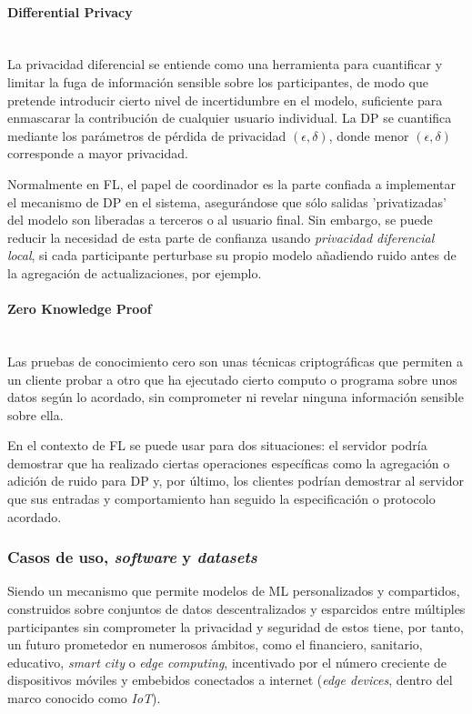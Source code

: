 \documentclass[00-Trabajo_Final.tex]{subfiles}
\begin{document}
\paragraph*{Differential Privacy}\mbox{}\\
La privacidad diferencial se entiende como una herramienta para cuantificar y limitar la fuga de información sensible sobre los participantes, de modo que pretende introducir cierto nivel de incertidumbre en el modelo, suficiente para enmascarar la contribución de cualquier usuario individual. La DP se cuantifica mediante los parámetros de pérdida de privacidad $(\epsilon, \delta)$, donde menor $(\epsilon, \delta)$ corresponde a mayor privacidad.

Normalmente en FL, el papel de coordinador es la parte confiada a implementar el mecanismo de DP en el sistema, asegurándose que sólo salidas 'privatizadas' del modelo son liberadas a terceros o al usuario final. Sin embargo, se puede reducir la necesidad de esta parte de confianza usando \textit{privacidad diferencial local}, si cada participante perturbase su propio modelo añadiendo ruido antes de la agregación de actualizaciones, por ejemplo.

\paragraph*{Zero Knowledge Proof}\mbox{}\\
Las pruebas de conocimiento cero son  unas técnicas criptográficas que permiten a un cliente probar a otro que ha ejecutado cierto computo o programa sobre unos datos según lo acordado, sin comprometer ni revelar ninguna información sensible sobre ella.

En el contexto de FL se puede usar para dos situaciones: el servidor podría demostrar que ha realizado ciertas operaciones específicas como la agregación o adición de ruido para DP y, por último, los clientes podrían demostrar al servidor que sus entradas y comportamiento han seguido la especificación o protocolo acordado.

\subsubsection{Casos de uso, \textit{software} y \textit{datasets}}
Siendo un mecanismo que permite modelos de ML personalizados y compartidos, construidos sobre conjuntos de datos descentralizados y esparcidos entre múltiples participantes sin comprometer la privacidad y seguridad de estos tiene, por tanto, un futuro prometedor en numerosos ámbitos, como el financiero, sanitario, educativo, \textit{smart city} o \textit{edge computing}, incentivado por el número creciente de dispositivos móviles y embebidos conectados a internet (\textit{edge devices}, dentro del marco conocido como \textit{IoT}).
\end{document}
